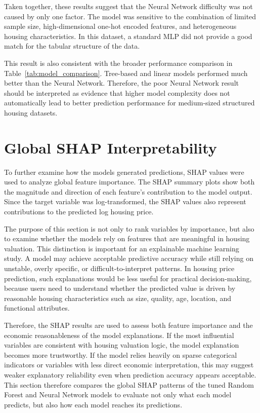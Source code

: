 \documentclass[12pt,a4paper,oneside,openany]{book}
\begin{document}
Taken together, these results suggest that the Neural Network difficulty was not caused by only one factor. The model was sensitive to the combination of limited sample size, high-dimensional one-hot encoded features, and heterogeneous housing characteristics. In this dataset, a standard MLP did not provide a good match for the tabular structure of the data.

This result is also consistent with the broader performance comparison in Table~\ref{tab:model_comparison}. Tree-based and linear models performed much better than the Neural Network. Therefore, the poor Neural Network result should be interpreted as evidence that higher model complexity does not automatically lead to better prediction performance for medium-sized structured housing datasets.


\section{Global SHAP Interpretability}

To further examine how the models generated predictions, SHAP values were used to analyze global feature importance. The SHAP summary plots show both the magnitude and direction of each feature's contribution to the model output. Since the target variable was log-transformed, the SHAP values also represent contributions to the predicted log housing price.

The purpose of this section is not only to rank variables by importance, but also to examine whether the models rely on features that are meaningful in housing valuation. This distinction is important for an explainable machine learning study. A model may achieve acceptable predictive accuracy while still relying on unstable, overly specific, or difficult-to-interpret patterns. In housing price prediction, such explanations would be less useful for practical decision-making, because users need to understand whether the predicted value is driven by reasonable housing characteristics such as size, quality, age, location, and functional attributes.

Therefore, the SHAP results are used to assess both feature importance and the economic reasonableness of the model explanations. If the most influential variables are consistent with housing valuation logic, the model explanation becomes more trustworthy. If the model relies heavily on sparse categorical indicators or variables with less direct economic interpretation, this may suggest weaker explanatory reliability even when prediction accuracy appears acceptable. This section therefore compares the global SHAP patterns of the tuned Random Forest and Neural Network models to evaluate not only what each model predicts, but also how each model reaches its predictions.
\end{document}
